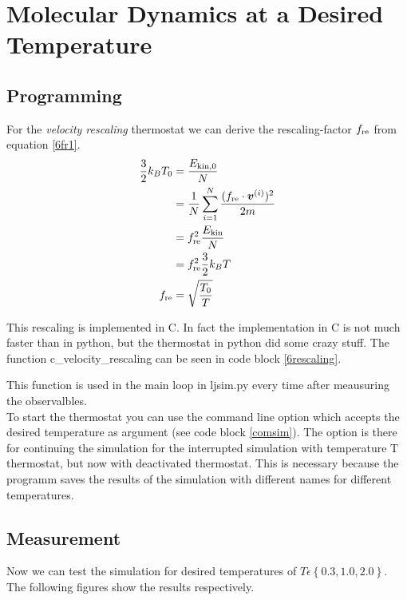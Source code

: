 \section{Molecular Dynamics at a Desired Temperature}

\subsection*{Programming}

For the \emph{velocity rescaling} thermostat we can derive the rescaling-factor $f_\text{re}$ from equation \eqref{6fr1}.
\begin{align}
\frac{3}{2}k_BT_0
	&= \frac{E_{\text{kin},0}}{N}
	\label{6fr1}\\
&= \frac{1}{N}\sum_{i=1}^{N} \frac{(f_\text{re}\cdot\boldsymbol{v}^{(i)})^2}{2m}
	\label{6fr2}\\
&= f_\text{re}^2\frac{E_\text{kin}}{N}
	\label{6fr3}\\
&=f_\text{re}^2\frac{3}{2}k_BT
	\label{6fr4}\\
f_\text{re}
	&= \sqrt{\frac{T_0}{T}}
	\label{6r5}
\end{align}

This rescaling is implemented in C. In fact the implementation in C is not much faster than in python, but the thermostat in python did some crazy stuff.
The function c\_velocity\_rescaling can be seen in code block \ref{6rescaling}.


This function is used in the main loop in ljsim.py every time after meausuring the observalbles.\\

To start the thermostat you can use the command line option  which accepts the desired temperature as argument (see code block \ref{comsim}).
The option  is there for continuing the simulation for the interrupted simulation with temperature T thermostat, but now with deactivated thermostat.
This is necessary because the programm saves the results of the simulation with different names for different temperatures.

\subsection*{Measurement}

Now we can test the simulation for desired temperatures of  $T\epsilon\left\lbrace 0.3,1.0,2.0\right\rbrace $. The following figures show the results respectively.

